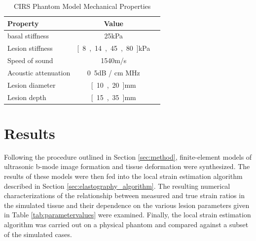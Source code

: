 			\begin{table}[!t]
				\centering
				\caption{CIRS Phantom Model Mechanical Properties}
				\label{tab:phantomproperties}
				\begin{tabular}{lcc}
					\toprule
					Property & Value \\
					\midrule
					\add[MFP]{Nominal} basal stiffness & \unit{25}{kPa} \\
					Lesion stiffness & \unit{[8, 14, 45, 80]}{kPa} \\
					Speed of sound & \unit{1540}{m/s} \\
					Acoustic attenuation & \unit{0.5}{dB / cm \usk MHz} \\
					Lesion diameter & \unit{[10, 20]}{mm} \\
					Lesion depth & \unit{[15, 35]}{mm} \\
					\bottomrule
				\end{tabular}
			\end{table}

	\section{Results}
		Following the procedure outlined in Section \ref{sec:method}, finite-element models of ultrasonic b-mode image formation and tissue deformation were synthesized. The results of these models were then fed into the local strain estimation algorithm described in Section \ref{sec:elastography_algorithm}. The resulting numerical characterizations of the relationship between measured and true strain ratios in the simulated tissue and their dependence on the various lesion parameters given in Table \ref{tab:parametervalues} were examined. Finally, the local strain estimation algorithm was carried out on a physical phantom and compared against a subset of the simulated cases.

